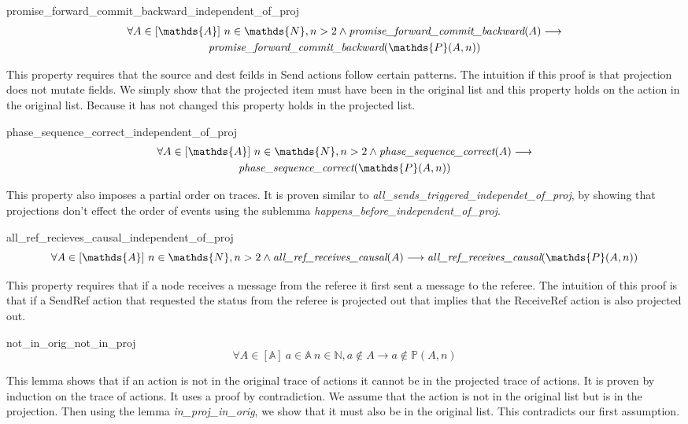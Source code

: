\documentclass[runningheads]{llncs}
\newcommand{\action}{\mathds{A}}
\newcommand{\listaction}{[\action]}
\newcommand{\projectsize}[2]{\mathds{P}(#1, #2)}
\newcommand{\pfcb}[1]{\emph{promise\_forward\_commit\_backward}(#1)}
\newcommand{\psc}[1]{\emph{phase\_sequence\_correct}(#1)}
\newcommand{\allrrc}[1]{\emph{all\_ref\_receives\_causal}(#1)}
\begin{document}
\begin{lemma}{promise\_forward\_commit\_backward\_independent\_of\_proj}
\begin{multline*}
\forall A \in \listaction\ n \in \mathds{N}, n > 2 \wedge \pfcb{A} \longrightarrow \\
\pfcb{\projectsize{A}{n}} 
\end{multline*}
\end{lemma}
This property requires that the source and dest feilds in Send actions follow certain patterns. The intuition if this proof is that projection does not mutate fields. We simply show that the projected item must have been in the original list and this property holds on the action in the original list. Because it has not changed this property holds in the projected list.

\begin{lemma}{phase\_sequence\_correct\_independent\_of\_proj}
\begin{multline*}
\forall A \in \listaction\ n \in \mathds{N}, n > 2 \wedge \psc{A} \longrightarrow \\
\psc{\projectsize{A}{n}}
\end{multline*}
\end{lemma}
This property also imposes a partial order on traces. It is proven similar to \emph{all\_sends\_triggered\_independet\_of\_proj}, by showing that projections don't effect the order of events using the sublemma \emph{happens\_before\_independent\_of\_proj}. 

\begin{lemma}{all\_ref\_recieves\_causal\_independent\_of\_proj}
$$ \forall A \in \listaction\ n \in \mathds{N}, n > 2 \wedge \allrrc{A} \longrightarrow \allrrc{\projectsize{A}{n}} $$
\end{lemma}
This property requires that if a node receives a message from the referee it first sent a message to the referee. The intuition of this proof is that if a SendRef action that requested the status from the referee is projected out that implies that the ReceiveRef action is also projected out.

\begin{lemma}{not\_in\_orig\_not\_in\_proj}
$$ \forall A \in \listaction\ a \in \action\ n \in \mathds{N}, a \notin A  \longrightarrow a \notin \projectsize{A}{n} $$
\end{lemma}
This lemma shows that if an action is not in the original trace of actions it cannot be in the projected trace of actions. It is proven by induction on the trace of actions. It uses a proof by contradiction. We assume that the action is not in the original list but is in the projection. Then using the lemma \emph{in\_proj\_in\_orig}, we show that it must also be in the original list. This contradicts our first assumption.
\end{document}
